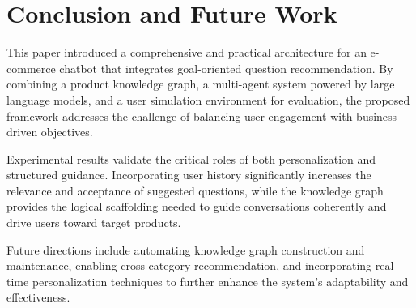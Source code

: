 \section{Conclusion and Future Work}\label{sec:conclusion} 

This paper introduced a comprehensive and practical architecture for an e-commerce chatbot that integrates goal-oriented question recommendation. By combining a product knowledge graph, a multi-agent system powered by large language models, and a user simulation environment for evaluation, the proposed framework addresses the challenge of balancing user engagement with business-driven objectives.

Experimental results validate the critical roles of both personalization and structured guidance. Incorporating user history significantly increases the relevance and acceptance of suggested questions, while the knowledge graph provides the logical scaffolding needed to guide conversations coherently and drive users toward target products.

Future directions include automating knowledge graph construction and maintenance, enabling cross-category recommendation, and incorporating real-time personalization techniques to further enhance the system’s adaptability and effectiveness.




